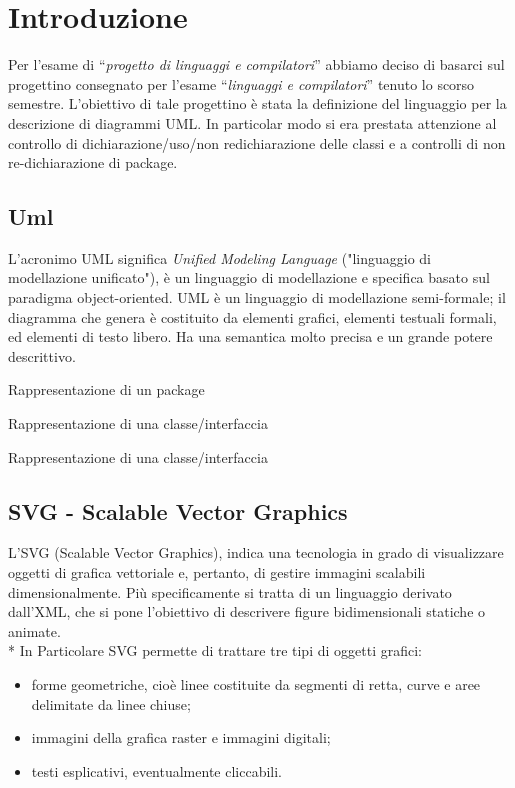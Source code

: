 \chapter{Introduzione}

Per l'esame di ``\emph{progetto di linguaggi e compilatori}'' abbiamo deciso di
basarci sul progettino consegnato per l'esame ``\emph{linguaggi e compilatori}''
tenuto lo scorso semestre.
L'obiettivo di tale progettino è stata la definizione del linguaggio per la 
descrizione di diagrammi UML. In particolar modo si era prestata attenzione al
controllo di dichiarazione/uso/non redichiarazione
delle classi e a controlli di non re-dichiarazione di package.


\section{Uml} 

L'acronimo UML significa \emph{Unified Modeling Language} ("linguaggio di modellazione
unificato"), è un linguaggio di modellazione e specifica basato sul paradigma object-oriented. 
UML è un linguaggio di modellazione semi-formale; il diagramma che genera è costituito da elementi
grafici, elementi testuali formali, ed elementi di testo libero. Ha una semantica molto precisa e un
grande potere descrittivo.



Rappresentazione di un package



Rappresentazione di una classe/interfaccia



Rappresentazione di una classe/interfaccia





\section{SVG - Scalable Vector Graphics} 
L'SVG (Scalable Vector Graphics), indica una tecnologia in grado di visualizzare oggetti 
di grafica vettoriale e, pertanto, di gestire immagini scalabili dimensionalmente.
Più specificamente si tratta di un linguaggio derivato dall'XML, che si pone l'obiettivo 
di descrivere figure bidimensionali statiche o animate. \\*
In Particolare SVG permette di trattare tre tipi di oggetti grafici:

\begin{itemize}
  \item forme geometriche, cioè linee costituite da segmenti di retta, curve e
  aree delimitate da linee chiuse;
  \item immagini della grafica raster e immagini digitali;
  \item testi esplicativi, eventualmente cliccabili.
\end{itemize} 

